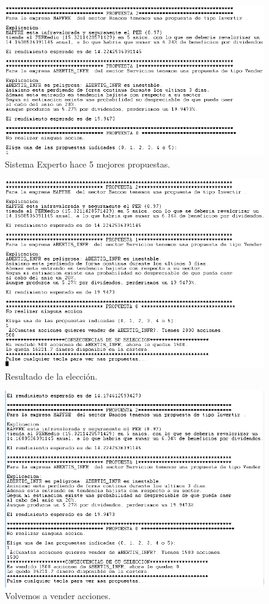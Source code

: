 \documentclass[12pt]{article}
\begin{document}
\begin{figure}[H]
	\includegraphics[width=15cm]{4.png} 
	\caption{Sistema Experto hace 5 mejores propuestas.}
	\label{cuatro} 
\end{figure}

\begin{figure}[H]
	\includegraphics[width=18cm]{5.png} 
	\caption{Resultado de la elección.}
	\label{cinco} 
\end{figure}

\begin{figure}[H]
	\includegraphics[width=18cm]{6.png} 
	\caption{Volvemos a vender acciones.}
	\label{seis} 
\end{figure}
\end{document}
